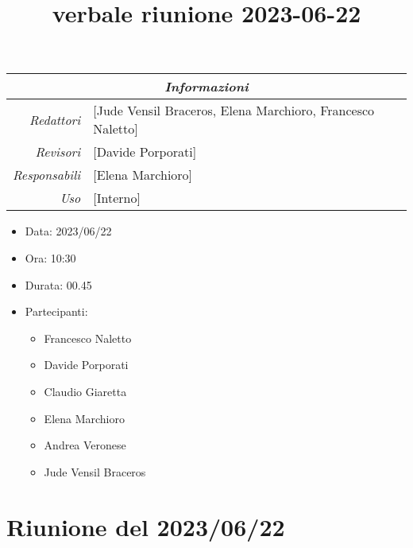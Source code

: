 \documentclass[12pt]{article}
\begin{document}
\graphicspath{ {../../templates/img} }

\title{verbale riunione 2023-06-22}

\firstPage
\maketitle

\begin{center}
\begin{tabular}{r | l}
    \multicolumn{2}{c}{\textit{Informazioni}}\\
    \hline
    
        \textit{Redattori} &
        [Jude Vensil Braceros, Elena Marchioro, Francesco Naletto]\makecell{}\\
    
        \textit{Revisori} &
        [Davide Porporati]\makecell{}\\
        \textit{Responsabili} &
        [Elena Marchioro]\makecell{}\\
            \textit{Uso} & 
            [Interno]\makecell{}\\
\end{tabular}
    \begin{itemize}
    \item[] Data: 2023/06/22
    \item[] Ora: 10:30
    \item[] Durata: 00.45
    \item[] Partecipanti:
    \begin{itemize}
    \item[] Francesco Naletto
    \item[] Davide Porporati
    \item[] Claudio Giaretta
    \item[] Elena Marchioro
    \item[] Andrea Veronese
    \item[] Jude Vensil Braceros
    \end{itemize}
\end{itemize}
\end{center}


\tableofcontents
\printindex 
\section{Riunione del 2023/06/22}
\end{document}
